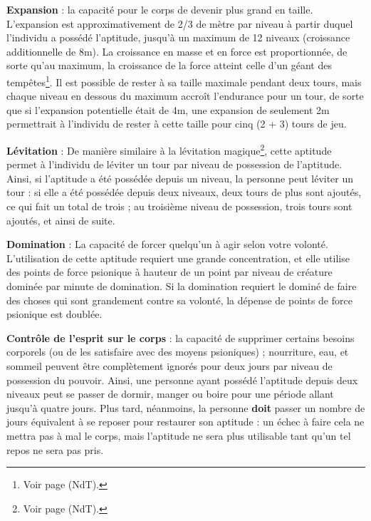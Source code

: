{\bigskip

\textbf{Expansion} : la capacité pour le corps de devenir plus grand en taille. L'expansion est approximativement de 2/3 de mètre par niveau à partir duquel l'individu a possédé l'aptitude, jusqu'à un maximum de 12 niveaux (croissance additionnelle de 8m). La croissance en masse et en force est proportionnée, de sorte qu'au maximum, la croissance de la force atteint celle d'un géant des tempêtes\footnote{Voir page \pageref{monstre-geant-des-tempetes} (NdT).}. Il est possible de rester à sa taille maximale pendant deux tours, mais chaque niveau en dessous du maximum accroît l'endurance pour un tour, de sorte que si l'expansion potentielle était de 4m, une expansion de seulement 2m permettrait à l'individu de rester à cette taille pour cinq (2 + 3) tours de jeu.

\bigskip

\textbf{Lévitation} : De manière similaire à la lévitation magique\footnote{Voir page \pageref{sort-levitation} (NdT).}, cette aptitude permet à l'individu de léviter un tour par niveau de possession de l'aptitude. Ainsi, si l'aptitude a été possédée depuis un niveau, la personne peut léviter un tour : si elle a été possédée depuis deux niveaux, deux tours de plus sont ajoutés, ce qui fait un total de trois ; au troisième niveau de possession, trois tours sont ajoutés, et ainsi de suite.

\bigskip

\textbf{Domination} : La capacité de forcer quelqu'un à agir selon votre volonté. L'utilisation de cette aptitude requiert une grande concentration, et elle utilise des points de force psionique à hauteur de un point par niveau de créature dominée par minute de domination. Si la domination requiert le dominé de faire des choses qui sont grandement contre sa volonté, la dépense de points de force psionique est doublée.

\bigskip

\textbf{Contrôle de l'esprit sur le corps} : la capacité de supprimer certains besoins corporels (ou de les satisfaire avec des moyens psioniques) ; nourriture, eau, et sommeil peuvent être complètement ignorés pour deux jours par niveau de possession du pouvoir. Ainsi, une personne ayant possédé l'aptitude depuis deux niveaux peut se passer de dormir, manger ou boire pour une période allant jusqu'à quatre jours. Plus tard, néanmoins, la personne \textbf{doit} passer un nombre de jours équivalent à se reposer pour restaurer son aptitude : un échec à faire cela ne mettra pas à mal le corps, mais l'aptitude ne sera plus utilisable tant qu'un tel repos ne sera pas pris.

}
